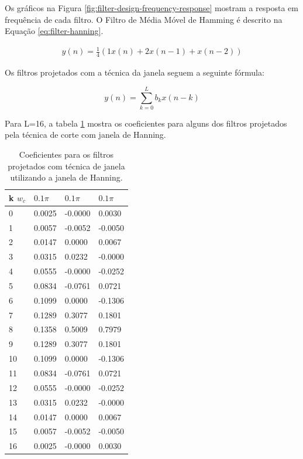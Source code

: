 Os gráficos na Figura \ref{fig:filter-design-frequency-response} mostram a resposta em frequência de cada filtro. O Filtro de Média Móvel de Hamming é descrito na Equação \ref{eq:filter-hanning}.

\begin{align}
\label{eq:filter-hanning}
y(n) = \frac{1}{4}(1 x(n) + 2 x(n-1) + x(n-2))
\end{align}

Os filtros projetados com a técnica da janela seguem a seguinte fórmula:

\begin{equation}
	y(n) = \sum_{k=0}^L b_k x(n-k)
\end{equation}

Para L=16, a tabela \ref{tab:fir-filters-coefs} mostra os coeficientes para alguns dos filtros projetados pela técnica de corte com janela de Hanning.

\begin{table}
\centering
\begin{tabular}{|l|l|l|l|}\hline
k \/$w_c$ & $0.1\pi$ & $0.1\pi$ & $0.1\pi$ \\ \hline
  0	& 0.0025	&   -0.0000	&		0.0030 \\		
 1	& 0.0057	&   -0.0052	&	   -0.0050 \\	
 2	& 0.0147	&    0.0000	&	    0.0067 \\	
 3	& 0.0315	&    0.0232	&	   -0.0000 \\	
 4	& 0.0555	&   -0.0000	&	   -0.0252 \\	
 5	& 0.0834	&   -0.0761	&	    0.0721 \\	
 6	& 0.1099	&    0.0000	&	   -0.1306 \\	
 7	& 0.1289	&    0.3077	&	    0.1801 \\	
 8	& 0.1358	&    0.5009	&	    0.7979 \\	
 9	& 0.1289	&    0.3077	&	    0.1801 \\	
10	& 0.1099	&    0.0000	&	   -0.1306 \\	
11	& 0.0834	&   -0.0761	&	    0.0721 \\	
12	& 0.0555	&   -0.0000	&	   -0.0252 \\	
13	& 0.0315	&    0.0232	&	   -0.0000 \\	
14	& 0.0147	&    0.0000	&	    0.0067 \\	
15	& 0.0057	&   -0.0052	&	   -0.0050 \\	
16	& 0.0025	&   -0.0000	&	    0.0030 \\
\hline
\end{tabular}
\caption{Coeficientes para os filtros projetados com técnica de janela utilizando a janela de Hanning.}
\label{tab:fir-filters-coefs}
\end{table}


